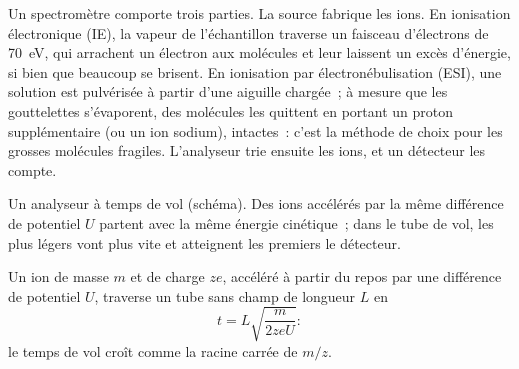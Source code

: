 Un spectromètre comporte trois parties. La source fabrique les ions. En ionisation électronique (IE), la
vapeur de l'échantillon traverse un faisceau d'électrons de \qty{70}{eV}, qui arrachent un électron aux
molécules et leur laissent un excès d'énergie, si bien que beaucoup se brisent. En ionisation par
électronébulisation (ESI), une solution est pulvérisée à partir d'une aiguille chargée~; à mesure que les
gouttelettes s'évaporent, des molécules les quittent en portant un proton supplémentaire (ou un ion
sodium), intactes~: c'est la méthode de choix pour les grosses molécules fragiles. L'analyseur trie
ensuite les ions, et un détecteur les compte.

\begin{omfigure}
\par\vspace{4pt}

{\small Un analyseur à temps de vol (schéma). Des ions accélérés par la même différence de potentiel
$U$ partent avec la même énergie cinétique~; dans le tube de vol, les plus légers vont plus vite et
atteignent les premiers le détecteur.}
\end{omfigure}

\begin{proposition}\label{prop:b2:mass-spec-atomic:time-of-flight}
Un ion de masse $m$ et de charge $ze$, accéléré à partir du repos par une différence de potentiel $U$,
traverse un tube sans champ de longueur $L$ en
\begin{equation*}
t = L\sqrt{\frac{m}{2zeU}}:
\end{equation*}
le temps de vol croît comme la racine carrée de $m/z$.
\end{proposition}

